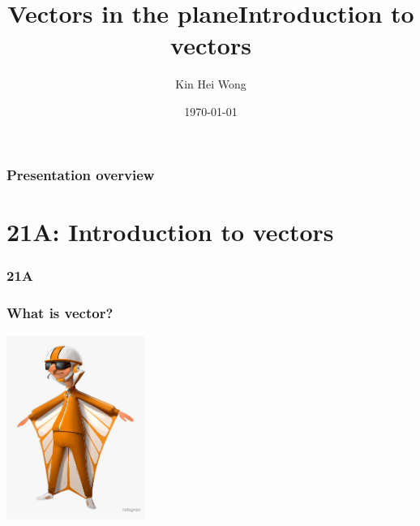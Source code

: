 \documentclass[
	11pt, %
]{beamer}
\title{Vectors in the plane}
\author{Kin Hei Wong}
\date{\today}
\begin{document}
\begin{frame}
    \titlepage
\end{frame}

\begin{frame}
    \frametitle{Presentation overview}
    \tableofcontents
\end{frame}

\section{21A: Introduction to vectors}
\begin{frame}
    \frametitle{21A}
    \begin{center}
        \title{Introduction to vectors}
        \maketitle
    \end{center}
\end{frame}

\begin{frame}
    \frametitle{What is vector?}
    \begin{center}
        \includegraphics[height=6cm]{vector_d.jpg}
    \end{center}
\end{frame}
\end{document}
